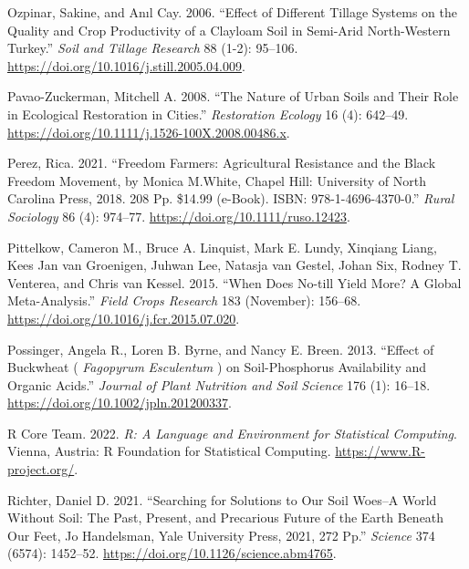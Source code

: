 \documentclass[
  12pt,
]{article}
\newlength{\cslhangindent}
\newlength{\cslentryspacingunit} %
\newenvironment{CSLReferences}[2] %
 {%
  \setlength{\parindent}{0pt}
  \ifodd #1
  \let\oldpar\par
  \def\par{\hangindent=\cslhangindent\oldpar}
  \fi
  \setlength{\parskip}{#2\cslentryspacingunit}
 }%
 {}
\begin{document}
\begin{CSLReferences}{1}{0}
\leavevmode{}%
Ozpinar, Sakine, and Anıl Cay. 2006. {``Effect of Different Tillage Systems on the Quality and Crop Productivity of a Clay\textendash loam Soil in Semi-Arid North-Western {Turkey}.''} \emph{Soil and Tillage Research} 88 (1-2): 95--106. \url{https://doi.org/10.1016/j.still.2005.04.009}.

\leavevmode{}%
Pavao-Zuckerman, Mitchell A. 2008. {``The {Nature} of {Urban Soils} and {Their Role} in {Ecological Restoration} in {Cities}.''} \emph{Restoration Ecology} 16 (4): 642--49. \url{https://doi.org/10.1111/j.1526-100X.2008.00486.x}.

\leavevmode{}%
Perez, Rica. 2021. {``Freedom {Farmers}: {Agricultural Resistance} and the {Black Freedom Movement}, by {Monica M}.{White}, {Chapel Hill}: {University} of {North Carolina Press}, 2018. 208 Pp. \$14.99 (e-Book). {ISBN}: 978-1-4696-4370-0.''} \emph{Rural Sociology} 86 (4): 974--77. \url{https://doi.org/10.1111/ruso.12423}.

\leavevmode{}%
Pittelkow, Cameron M., Bruce A. Linquist, Mark E. Lundy, Xinqiang Liang, Kees Jan van Groenigen, Juhwan Lee, Natasja van Gestel, Johan Six, Rodney T. Venterea, and Chris van Kessel. 2015. {``When Does No-till Yield More? {A} Global Meta-Analysis.''} \emph{Field Crops Research} 183 (November): 156--68. \url{https://doi.org/10.1016/j.fcr.2015.07.020}.

\leavevmode{}%
Possinger, Angela R., Loren B. Byrne, and Nancy E. Breen. 2013. {``Effect of Buckwheat ( {\emph{Fagopyrum}}{ \emph{Esculentum}} ) on Soil-Phosphorus Availability and Organic Acids.''} \emph{Journal of Plant Nutrition and Soil Science} 176 (1): 16--18. \url{https://doi.org/10.1002/jpln.201200337}.

\leavevmode{}%
R Core Team. 2022. \emph{R: A Language and Environment for Statistical Computing}. Vienna, Austria: R Foundation for Statistical Computing. \url{https://www.R-project.org/}.

\leavevmode{}%
Richter, Daniel D. 2021. {``Searching for Solutions to Our Soil Woes--{A World Without Soil}: {The Past}, {Present}, and {Precarious Future} of the {Earth Beneath Our Feet}, {Jo Handelsman}, {Yale University Press}, 2021, 272 Pp.''} \emph{Science} 374 (6574): 1452--52. \url{https://doi.org/10.1126/science.abm4765}.


\end{CSLReferences}
\end{document}
